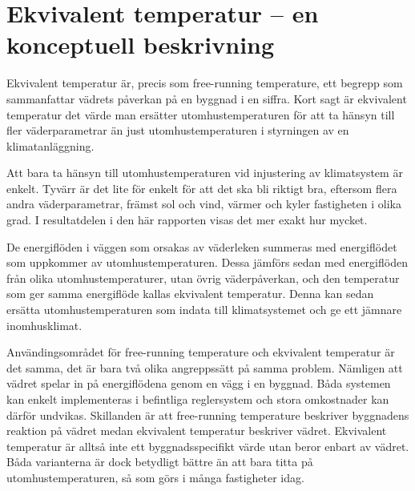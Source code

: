 \section{Ekvivalent temperatur  – en konceptuell beskrivning}
\label{sec:ekv_temp}

Ekvivalent temperatur är, precis som free-running temperature, ett begrepp som sammanfattar vädrets påverkan på en byggnad i en siffra. Kort sagt är ekvivalent temperatur det värde man ersätter utomhustemperaturen för att ta 
hänsyn till fler väderparametrar än just utomhustemperaturen i styrningen av en 
klimatanläggning.

Att bara ta hänsyn till utomhustemperaturen vid injustering av klimatsystem är enkelt. 
Tyvärr är det lite för enkelt för att det ska bli riktigt bra, eftersom flera andra 
väderparametrar, främst sol och vind, värmer och kyler fastigheten i olika grad. I resultatdelen i den här rapporten visas det mer exakt hur mycket.

De energiflöden i väggen som orsakas av väderleken summeras med energiflödet 
som uppkommer av utomhustemperaturen. Dessa jämförs sedan med energiflöden från 
olika utomhustemperaturer, utan övrig väderpåverkan, och den temperatur som ger 
samma energiflöde kallas ekvivalent temperatur. Denna kan sedan ersätta 
utomhustemperaturen som indata till klimatsystemet och ge ett jämnare inomhusklimat. 

Användingsområdet för free-running temperature och ekvivalent temperatur är det samma, det är bara två olika angreppssätt på samma problem. Nämligen att vädret spelar in på energiflödena genom en vägg i en byggnad.  Båda systemen kan enkelt implementeras i befintliga reglersystem och stora omkostnader kan därför undvikas. Skillanden är att  free-running temperature beskriver byggnadens reaktion på vädret medan ekvivalent temperatur beskriver vädret. Ekvivalent temperatur är alltså inte ett byggnadsspecifikt värde utan beror enbart av vädret. Båda varianterna är dock betydligt bättre än att bara titta på utomhustemperaturen, så som görs i många fastigheter idag.


